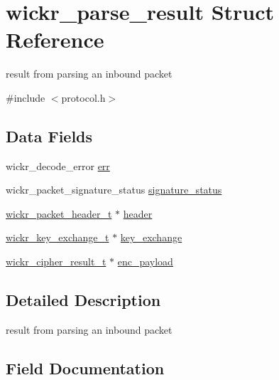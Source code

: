 \hypertarget{structwickr__parse__result}{}\section{wickr\+\_\+parse\+\_\+result Struct Reference}
\label{structwickr__parse__result}


result from parsing an inbound packet  




{\ttfamily \#include $<$protocol.\+h$>$}

\subsection*{Data Fields}
\begin{DoxyCompactItemize}
\item 
wickr\+\_\+decode\+\_\+error \mbox{\hyperlink{structwickr__parse__result_a69a3ee332921b4fdbc0e07dbfa74a8ed}{err}}
\item 
wickr\+\_\+packet\+\_\+signature\+\_\+status \mbox{\hyperlink{structwickr__parse__result_a989166b5471898853f03b9e9c58f69c0}{signature\+\_\+status}}
\item 
\mbox{\hyperlink{structwickr__packet__header}{wickr\+\_\+packet\+\_\+header\+\_\+t}} $\ast$ \mbox{\hyperlink{structwickr__parse__result_acf549d7cbae0f227d5aa60c3c5bb12d3}{header}}
\item 
\mbox{\hyperlink{structwickr__key__exchange}{wickr\+\_\+key\+\_\+exchange\+\_\+t}} $\ast$ \mbox{\hyperlink{structwickr__parse__result_ab33e5d00121c229280bbee814ca7ef5a}{key\+\_\+exchange}}
\item 
\mbox{\hyperlink{structwickr__cipher__result}{wickr\+\_\+cipher\+\_\+result\+\_\+t}} $\ast$ \mbox{\hyperlink{structwickr__parse__result_a584d3b94e032f09188ee4006c067c180}{enc\+\_\+payload}}
\end{DoxyCompactItemize}


\subsection{Detailed Description}
result from parsing an inbound packet 

\subsection{Field Documentation}
\mbox{\label{structwickr__parse__result_a584d3b94e032f09188ee4006c067c180}} 
